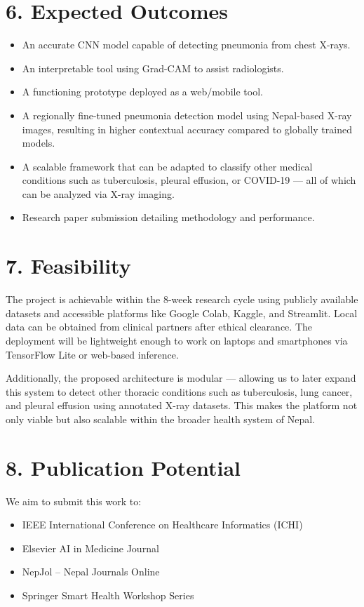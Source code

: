 \documentclass[12pt]{article}
\begin{document}
\section*{6. Expected Outcomes}
\begin{itemize}
  \item An accurate CNN model capable of detecting pneumonia from chest X-rays.
  \item An interpretable tool using Grad-CAM to assist radiologists.
  \item A functioning prototype deployed as a web/mobile tool.
  \item A regionally fine-tuned pneumonia detection model using Nepal-based X-ray images, resulting in higher contextual accuracy compared to globally trained models.
  \item A scalable framework that can be adapted to classify other medical conditions such as tuberculosis, pleural effusion, or COVID-19 — all of which can be analyzed via X-ray imaging.
  \item Research paper submission detailing methodology and performance.
\end{itemize}

\section*{7. Feasibility}
The project is achievable within the 8-week research cycle using publicly available datasets and accessible platforms like Google Colab, Kaggle, and Streamlit. Local data can be obtained from clinical partners after ethical clearance. The deployment will be lightweight enough to work on laptops and smartphones via TensorFlow Lite or web-based inference.

Additionally, the proposed architecture is modular — allowing us to later expand this system to detect other thoracic conditions such as tuberculosis, lung cancer, and pleural effusion using annotated X-ray datasets. This makes the platform not only viable but also scalable within the broader health system of Nepal.

\section*{8. Publication Potential}
We aim to submit this work to:
\begin{itemize}
  \item IEEE International Conference on Healthcare Informatics (ICHI)
  \item Elsevier AI in Medicine Journal
  \item NepJol – Nepal Journals Online
  \item Springer Smart Health Workshop Series
\end{itemize}
\end{document}
